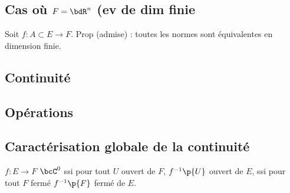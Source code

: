 \documentclass[a4paper,french,bookmarks]{book}
\begin{document}
    \subsection{Cas où $F = \bdR^n$ (ev de dim finie}
    Soit $f : A \subset E \to F$. Prop (admise) : toutes les normes sont équivalentes en dimension finie.
    
    \subsection{Continuité}
    \subsection{Opérations}
     
    \subsection{Caractérisation globale de la continuité}
     
    $f : E \to F$ $\bcC^0$ ssi pour tout $U$ ouvert de $F$, $f^{-1}\p{U}$ ouvert de $E$, ssi pour tout $F$ fermé $f^{-1}\p{F}$ fermé de $E$.
    
    
    
    
    
    
\end{document}
